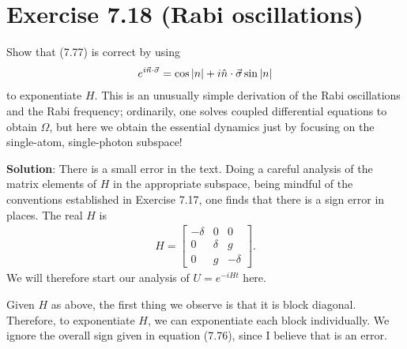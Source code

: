 \documentclass{book}
\begin{document}
    

\section*{Exercise 7.18 (Rabi oscillations)}
    Show that (7.77) is correct by using
    \begin{align}
        e^{i \vec{n}\cdot \vec{\sigma}} = \cos\abs{n} + i \hat{n}\cdot\vec{\sigma} \sin\abs{n}
    \end{align}
    to exponentiate $H$. This is an unusually simple derivation of the Rabi oscillations and the Rabi frequency; ordinarily, one solves coupled differential equations to obtain $\Omega$, but here we obtain the essential dynamics just by focusing on the single-atom, single-photon subspace!

    \textbf{Solution}: There is a small error in the text. Doing a careful analysis of the matrix elements of $H$ in the appropriate subspace, being mindful of the conventions established in Exercise 7.17, one finds that there is a sign error in places. The real $H$ is 
    \begin{align}
        H = \begin{bmatrix}
            -\delta & 0 & 0 \\
            0 & \delta & g \\
            0 & g & -\delta
        \end{bmatrix}.
    \end{align}
    We will therefore start our analysis of $U = e^{-i H t}$ here. 
    
    Given $H$ as above, the first thing we observe is that it is block diagonal. Therefore, to exponentiate $H$, we can exponentiate each block individually. We ignore the overall sign given in equation (7.76), since I believe that is an error.
\end{document}
